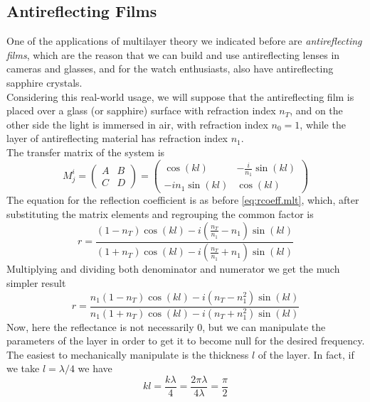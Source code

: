 \documentclass[../electromagnetism.tex]{subfiles}
\begin{document}
\subsection{Antireflecting Films}
One of the applications of multilayer theory we indicated before are \textit{antireflecting films}, which are the reason that we can build and use antireflecting lenses in cameras and glasses, and for the watch enthusiasts, also have antireflecting sapphire crystals.\\
Considering this real-world usage, we will suppose that the antireflecting film is placed over a glass (or sapphire) surface with refraction index $n_T$, and on the other side the light is immersed in air, with refraction index $n_0=1$, while the layer of antireflecting material has refraction index $n_1$.\\
The transfer matrix of the system is
\begin{equation*}
	M^i_j=\begin{pmatrix}
		A&B\\C&D
	\end{pmatrix}=\begin{pmatrix}
		\cos(kl)&-\frac{i}{n_1}\sin(kl)\\
		-in_1\sin(kl)&\cos(kl)
	\end{pmatrix}
\end{equation*}
The equation for the reflection coefficient is as before \eqref{eq:rcoeff.mlt}, which, after substituting the matrix elements and regrouping the common factor is
\begin{equation*}
	r=\frac{(1-n_T)\cos(kl)-i\left( \frac{n_T}{n_1}-n_1 \right)\sin(kl)}{(1+n_T)\cos(kl)-i\left( \frac{n_T}{n_1}+n_1 \right)\sin(kl)}
\end{equation*}
Multiplying and dividing both denominator and numerator we get the much simpler result
\begin{equation}
	r=\frac{n_1(1-n_T)\cos(kl)-i(n_T-n_1^2)\sin(kl)}{n_1(1+n_T)\cos(kl)-i(n_T+n_1^2)\sin(kl)}
	\label{eq:rcoeff.arc}
\end{equation}
Now, here the reflectance is not necessarily $0$, but we can manipulate the parameters of the layer in order to get it to become null for the desired frequency.\\
The easiest to mechanically manipulate is the thickness $l$ of the layer. In fact, if we take $l=\lambda/4$ we have
\begin{equation}
	kl=\frac{k\lambda}{4}=\frac{2\pi\lambda}{4\lambda}=\frac{\pi}{2}
	\label{eq:whylambdafourths.arc}
\end{equation}
\end{document}
